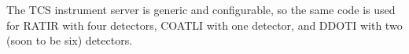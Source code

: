 \documentclass{article}
\begin{document}
The TCS instrument server is generic and configurable, so the same code is used for RATIR with four detectors, COATLI with one detector, and DDOTI with two (soon to be six) detectors.

%
%
%
%
%
%
%
\end{document}

